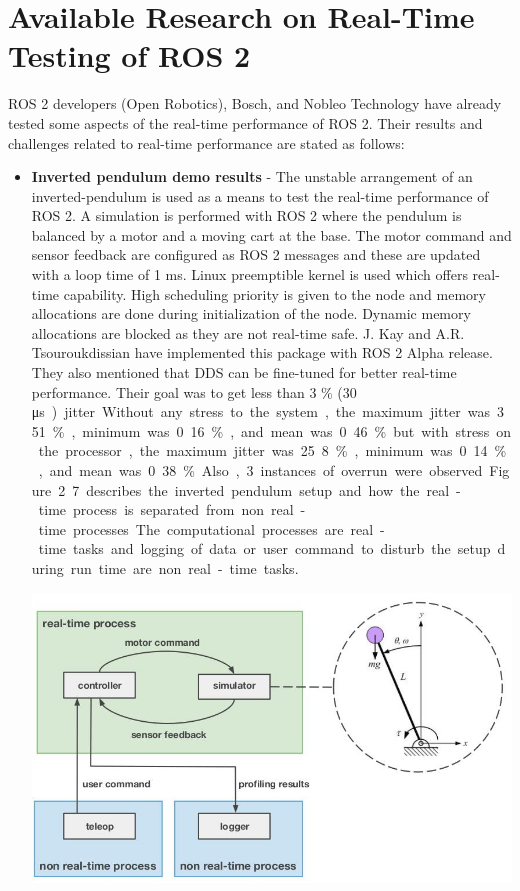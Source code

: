 \documentclass[%
xelatex,
	oneside,		%
	12pt,			%
	parskip=half,	%
	abstracton,
	chapterprefix=true%
    appendixprefix=true]
{scrbook}
\begin{document}
	\section{Available Research on Real-Time Testing of ROS 2}
\vspace*{0.5cm}
ROS 2 developers (Open Robotics), Bosch, and Nobleo Technology have already tested some aspects of the real-time performance of ROS 2. Their results and challenges related to real-time performance are stated as follows: 
\begin{itemize}
\item {\bfseries Inverted pendulum demo results} - The unstable arrangement of an inverted-pendulum is used as a means to test the real-time performance of ROS 2. A simulation is performed with ROS 2 where the pendulum is balanced by a motor and a moving cart at the base. The motor command and sensor feedback are configured as ROS 2 messages and these are updated with a loop time of 1 ms. Linux preemptible kernel is used which offers real-time capability. High scheduling priority is given to the node and memory allocations are done during initialization of the node. Dynamic memory allocations are blocked as they are not real-time safe. J. Kay and A.R. Tsouroukdissian have implemented this package with ROS 2 Alpha release. They also mentioned that DDS can be fine-tuned for better real-time performance. Their goal was to get less than 3 \% (30 \si\micro s) jitter. Without any stress to the system, the maximum jitter was 3.51 \%, minimum was 0.16 \%, and mean was 0.46 \% but with stress on the processor, the maximum jitter was 25.8 \%, minimum was 0.14 \%, and mean was 0.38 \%. Also, 3 instances of overrun were observed.


Figure 2.7 describes the inverted pendulum setup and how the real-time process is separated from non real-time processes. The computational processes are real-time tasks and logging of data or user command to disturb the setup during run time are non real-time tasks.
	\begin{center}
\includegraphics[scale=0.6]{fig/inverted.jpg}


\end{center}
\end{itemize}
\end{document}
